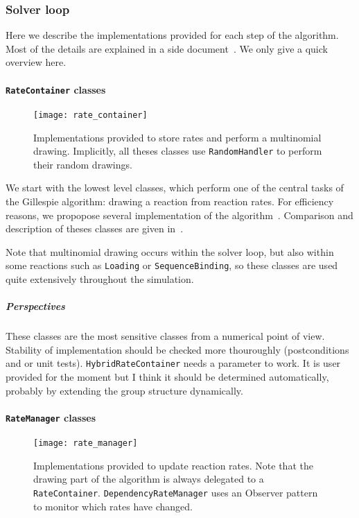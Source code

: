 \subsubsection{Solver loop}

Here we describe the implementations provided for each step of the algorithm. Most of the details are explained in a side document~\citep{cati}. We only give a quick overview here.

\paragraph{\texttt{RateContainer} classes}

\begin{figure}[!h]
  \centering
  \texttt{[image: rate\_container]}
  \caption{Implementations provided to store rates and perform a multinomial drawing. Implicitly, all theses classes use \texttt{RandomHandler} to perform their random drawings. }
  \label{fig:rate_container}
\end{figure}

We start with the lowest level classes, which perform one of the central tasks of the Gillespie algorithm: drawing a reaction from reaction rates. For efficiency reasons, we propopose several implementation of the algorithm~. Comparison and description of theses classes are given in~\citet{cati}. 

Note that multinomial drawing occurs within the solver loop, but also within some reactions such as \texttt{Loading} or \texttt{SequenceBinding}, so these classes are used quite extensively throughout the simulation.

\subparagraph{Perspectives} These classes are the most sensitive classes from a numerical point of view. Stability of implementation should be checked more thouroughly (postconditions and or unit tests). \texttt{HybridRateContainer} needs a parameter to work. It is user provided for the moment but I think it should be determined automatically, probably by extending the group structure dynamically.

\paragraph{\texttt{RateManager} classes}

\begin{figure}[!h]
  \centering
  \texttt{[image: rate\_manager]}
  \caption{Implementations provided to update reaction rates. Note that the drawing part of the algorithm is always delegated to a \texttt{RateContainer}. \texttt{DependencyRateManager} uses an Observer pattern to monitor which rates have changed.}
  \label{fig:rate_manager}
\end{figure}

